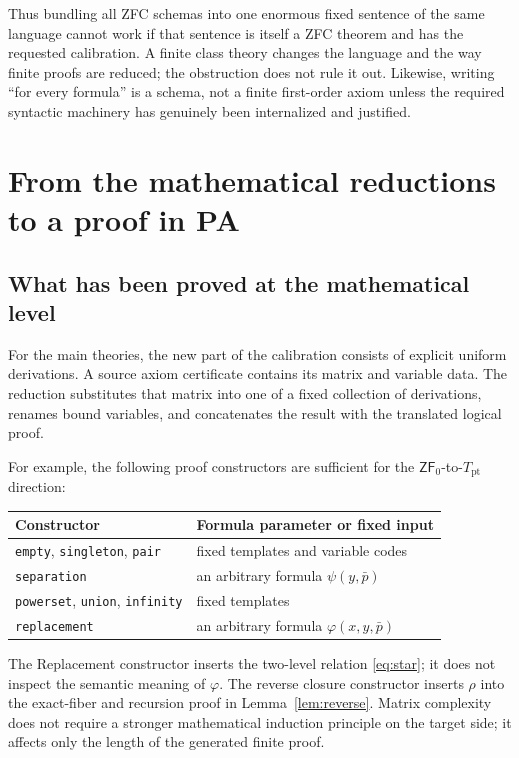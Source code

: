\documentclass[11pt,letterpaper]{article}
\theoremstyle{definition}\newtheorem{definition}[theorem]{Definition}
\theoremstyle{remark}\newtheorem{remark}[theorem]{Remark}
\newcommand{\ZFz}{\mathsf{ZF}_{0}}
\newcommand{\Tpt}{T_{\mathrm{pt}}}
\newcommand{\ps}{\bar p}
\begin{document}
Thus bundling all ZFC schemas into one enormous fixed sentence of the
same language cannot work if that sentence is itself a ZFC theorem and
has the requested calibration. A finite class theory changes the
language and the way finite proofs are reduced; the obstruction does
not rule it out. Likewise, writing ``for every formula'' is a schema,
not a finite first-order axiom unless the required syntactic machinery
has genuinely been internalized and justified.

\section{From the mathematical reductions to a proof in PA}
\label{sec:PA}

\subsection{What has been proved at the mathematical level}

For the main theories, the new part of the calibration consists of
explicit uniform derivations. A source axiom certificate contains its
matrix and variable data. The reduction substitutes that matrix into
one of a fixed collection of derivations, renames bound variables, and
concatenates the result with the translated logical proof.

For example, the following proof constructors are sufficient for the
$\ZFz$-to-$\Tpt$ direction:
\begin{center}
\begin{tabular}{ll}
\toprule
Constructor & Formula parameter or fixed input\\
\midrule
\texttt{empty}, \texttt{singleton}, \texttt{pair} & fixed templates and variable codes\\
\texttt{separation} & an arbitrary formula $\psi(y,\ps)$\\
\texttt{powerset}, \texttt{union}, \texttt{infinity} & fixed templates\\
\texttt{replacement} & an arbitrary formula $\varphi(x,y,\ps)$\\
\bottomrule
\end{tabular}
\end{center}
The Replacement constructor inserts the two-level relation
\eqref{eq:star}; it does not inspect the semantic meaning of $\varphi$.
The reverse closure constructor inserts $\rho$ into the exact-fiber and
recursion proof in Lemma~\ref{lem:reverse}. Matrix complexity does not
require a stronger mathematical induction principle on the target side;
it affects only the length of the generated finite proof.
\end{document}

